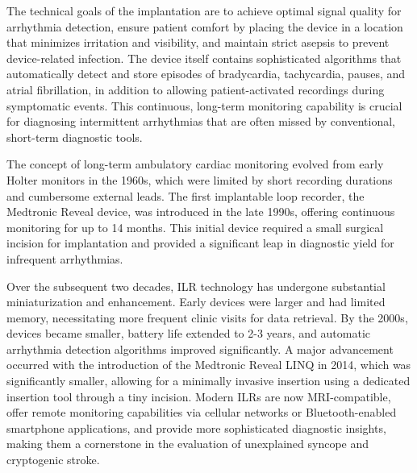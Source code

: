 The technical goals of the implantation are to achieve optimal signal quality for arrhythmia detection, ensure patient comfort by placing the device in a location that minimizes irritation and visibility, and maintain strict asepsis to prevent device-related infection. The device itself contains sophisticated algorithms that automatically detect and store episodes of bradycardia, tachycardia, pauses, and atrial fibrillation, in addition to allowing patient-activated recordings during symptomatic events. This continuous, long-term monitoring capability is crucial for diagnosing intermittent arrhythmias that are often missed by conventional, short-term diagnostic tools.

The concept of long-term ambulatory cardiac monitoring evolved from early Holter monitors in the 1960s, which were limited by short recording durations and cumbersome external leads. The first implantable loop recorder, the Medtronic Reveal\textregistered{} device, was introduced in the late 1990s, offering continuous monitoring for up to 14 months. This initial device required a small surgical incision for implantation and provided a significant leap in diagnostic yield for infrequent arrhythmias.

Over the subsequent two decades, ILR technology has undergone substantial miniaturization and enhancement. Early devices were larger and had limited memory, necessitating more frequent clinic visits for data retrieval. By the 2000s, devices became smaller, battery life extended to 2-3 years, and automatic arrhythmia detection algorithms improved significantly. A major advancement occurred with the introduction of the Medtronic Reveal LINQ\textregistered{} in 2014, which was significantly smaller, allowing for a minimally invasive insertion using a dedicated insertion tool through a tiny incision. Modern ILRs are now MRI-compatible, offer remote monitoring capabilities via cellular networks or Bluetooth-enabled smartphone applications, and provide more sophisticated diagnostic insights, making them a cornerstone in the evaluation of unexplained syncope and cryptogenic stroke.

